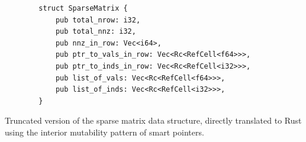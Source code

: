 \begin{listing}[H]
    \begin{verbatim}
        struct SparseMatrix {
            pub total_nrow: i32,
            pub total_nnz: i32,
            pub nnz_in_row: Vec<i64>,
            pub ptr_to_vals_in_row: Vec<Rc<RefCell<f64>>>,
            pub ptr_to_inds_in_row: Vec<Rc<RefCell<i32>>>,
            pub list_of_vals: Vec<Rc<RefCell<f64>>>,
            pub list_of_inds: Vec<Rc<RefCell<i32>>>,
        }
    \end{verbatim}
    \caption{Truncated version of the sparse matrix data structure, directly translated to Rust using the interior mutability pattern of smart pointers.}
    \label{listing:rust-sparse-matrix-structure}
\end{listing}



